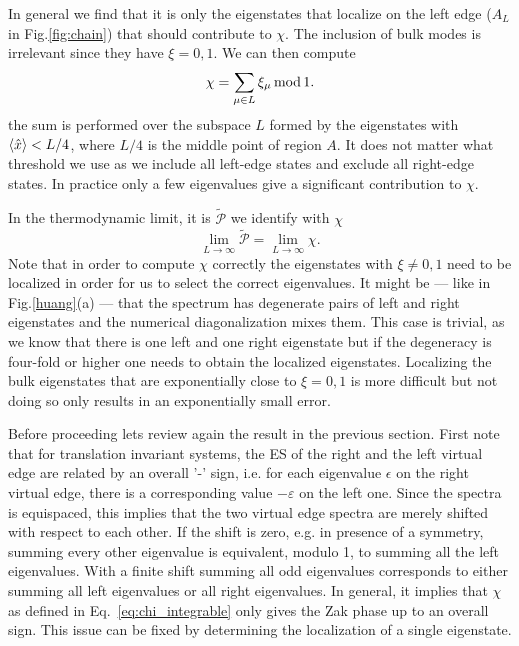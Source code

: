 \documentclass[twocolumn,amsmath,longbibliography,amssymb,superscriptaddress]{revtex4-1}
\begin{document}
In general we find that it is only the eigenstates that localize on the left edge ($A_L$ in Fig.\ref{fig:chain}) that should contribute to $\chi$. The inclusion of bulk modes is irrelevant since they have $\xi = 0,1$. We can then compute
\begin{equation}
\chi = \sum_{\mu \in L} \xi_\mu \, {\rm mod} \, 1. 
\label{eq:chi_left}
\end{equation}
the sum is performed over the subspace $L$ formed by the eigenstates with $\expval{\hat{x}}<L/4$, where $L/4$ is the middle point of region $A$. It does not matter what threshold we use as we include all left-edge states and exclude all right-edge states. In practice only a few eigenvalues give a significant contribution to $\chi$. 


In the thermodynamic limit, it is $\tilde{\mathcal{P}}$ we identify with $\chi$
\begin{equation}
\lim_{L \rightarrow \infty} \tilde{\mathcal{P}} = \lim_{L \rightarrow \infty} \chi.
\label{eq:ptilde_eq_chi}
\end{equation}
Note that in order to compute $\chi$ correctly the eigenstates with $\xi \neq 0,1$ need to be localized in order for us to select the correct eigenvalues. It might be --- like in Fig.\ref{huang}(a) --- that the spectrum has degenerate pairs of left and right eigenstates and the numerical diagonalization mixes them. This case is trivial, as we know that there is one left and one right eigenstate but if the degeneracy is four-fold or higher one needs to obtain the localized eigenstates. Localizing the bulk eigenstates that are exponentially close to $\xi = 0,1$ is more difficult but not doing so only results in an exponentially small error. 

Before proceeding lets review again the result in the previous section. First note that for translation invariant systems, the ES of the right and the left virtual edge are related by an overall '-' sign, i.e. for each eigenvalue $\epsilon$ on the right virtual edge, there is a corresponding value $-\varepsilon$ on the left one. 
Since the spectra is equispaced, this implies that the two virtual edge spectra are merely shifted with respect to each other.
If the shift is zero, e.g.  in presence of a symmetry, summing every other eigenvalue is equivalent, modulo 1, to summing all the left eigenvalues. With a finite shift summing all odd eigenvalues corresponds to either summing all left eigenvalues or all right eigenvalues. In general, it implies that $\chi$ as defined in Eq.~\eqref{eq:chi_integrable} only gives the Zak phase up to an overall sign. This issue can be fixed by determining the localization of a single eigenstate. 
\end{document}
